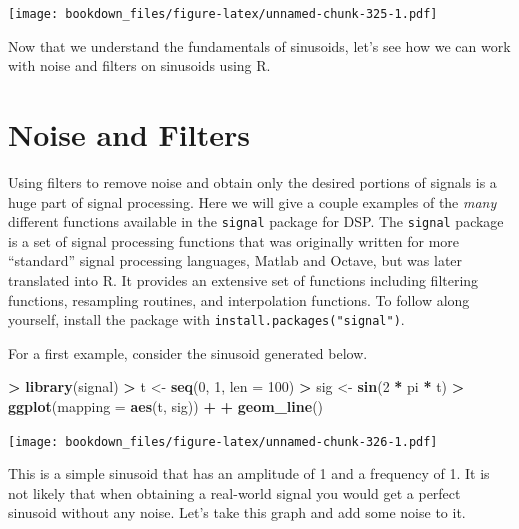 \documentclass[
]{krantz}
\makeatletter
\newenvironment{Shaded}{\begin{snugshade}}{\end{snugshade}}
\newcommand{\DataTypeTok}[1]{\textcolor[rgb]{0.27,0.27,0.27}{#1}}
\newcommand{\DecValTok}[1]{\textcolor[rgb]{0.06,0.06,0.06}{#1}}
\newcommand{\KeywordTok}[1]{\textcolor[rgb]{0.27,0.27,0.27}{\textbf{#1}}}
\newcommand{\NormalTok}[1]{#1}
\newcommand{\OperatorTok}[1]{\textcolor[rgb]{0.43,0.43,0.43}{\textbf{#1}}}
\newcommand{\StringTok}[1]{\textcolor[rgb]{0.5,0.5,0.5}{#1}}
\newenvironment{kframe}{%
\medskip{}
\setlength{\fboxsep}{.8em}
 \def\at@end@of@kframe{}%
 \ifinner\ifhmode%
  \def\at@end@of@kframe{\end{minipage}}%
  \begin{minipage}{\columnwidth}%
 \fi\fi%
 \def\FrameCommand##1{\hskip\@totalleftmargin \hskip-\fboxsep
 \colorbox{shadecolor}{##1}\hskip-\fboxsep
     \hskip-\linewidth \hskip-\@totalleftmargin \hskip\columnwidth}%
 \MakeFramed {\advance\hsize-\width
   \@totalleftmargin\z@ \linewidth\hsize
   \@setminipage}}%
 {\par\unskip\endMakeFramed%
 \at@end@of@kframe}
\renewenvironment{Shaded}{\begin{kframe}}{\end{kframe}}
\makeatother
\begin{document}
\texttt{[image: bookdown\_files/figure-latex/unnamed-chunk-325-1.pdf]}

Now that we understand the fundamentals of sinusoids, let's see how we can work with noise and filters on sinusoids using R.

\hypertarget{noise-and-filters}{%
\section{Noise and Filters}\label{noise-and-filters}}

Using filters to remove noise and obtain only the desired portions of signals is a huge part of signal processing. Here we will give a couple examples of the \emph{many} different functions available in the \texttt{signal} package for DSP. The \texttt{signal} package is a set of signal processing functions that was originally written for more ``standard'' signal processing languages, Matlab and Octave, but was later translated into R. It provides an extensive set of functions including filtering functions, resampling routines, and interpolation functions. To follow along yourself, install the package with \texttt{install.packages("signal")}.

For a first example, consider the sinusoid generated below.

\begin{Shaded}
\begin{Highlighting}[]
\OperatorTok{\textgreater{}}\StringTok{ }\KeywordTok{library}\NormalTok{(signal)}
\OperatorTok{\textgreater{}}\StringTok{ }\NormalTok{t \textless{}{-}}\StringTok{ }\KeywordTok{seq}\NormalTok{(}\DecValTok{0}\NormalTok{, }\DecValTok{1}\NormalTok{, }\DataTypeTok{len =} \DecValTok{100}\NormalTok{)}
\OperatorTok{\textgreater{}}\StringTok{ }\NormalTok{sig \textless{}{-}}\StringTok{ }\KeywordTok{sin}\NormalTok{(}\DecValTok{2} \OperatorTok{*}\StringTok{ }\NormalTok{pi }\OperatorTok{*}\StringTok{ }\NormalTok{t)}
\OperatorTok{\textgreater{}}\StringTok{ }\KeywordTok{ggplot}\NormalTok{(}\DataTypeTok{mapping =} \KeywordTok{aes}\NormalTok{(t, sig)) }\OperatorTok{+}\StringTok{ }
\OperatorTok{+}\StringTok{   }\KeywordTok{geom\_line}\NormalTok{()}
\end{Highlighting}
\end{Shaded}

\texttt{[image: bookdown\_files/figure-latex/unnamed-chunk-326-1.pdf]}

This is a simple sinusoid that has an amplitude of 1 and a frequency of 1. It is not likely that when obtaining a real-world signal you would get a perfect sinusoid without any noise. Let's take this graph and add some noise to it.
\end{document}
